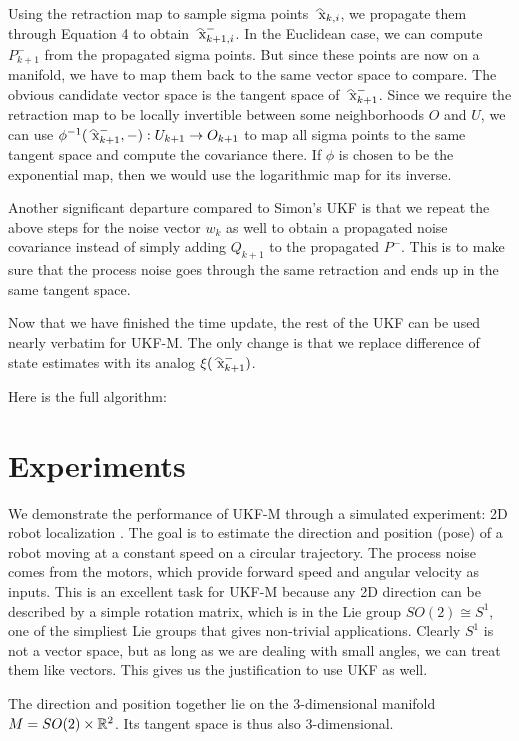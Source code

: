 \documentclass[12pt]{article}
\begin{document}
Using the retraction map to sample sigma points $ \wh{ x}_{k,i}$, we propagate them through Equation 4 to obtain $ \wh{ x}_{k+1,i}^{-}$. In the Euclidean case, we can compute $ P_{k+1}^{-}$ from the propagated sigma points. But since these points are now on a manifold, we have to map them back to the same vector space to compare. The obvious candidate vector space is the tangent space of $ \wh{ x}_{k+1}^{-}$. Since we require the retraction map to be locally invertible between some neighborhoods $O$ and $ U$, we can use $ \phi^{-1}(\wh{ x}_{k+1}^{-}, -) : U_{k+1} \to O_{k+1}$ to map all sigma points to the same tangent space and compute the covariance there. If $ \phi$ is chosen to be the exponential map, then we would use the logarithmic map for its inverse.

Another significant departure compared to Simon's UKF is that we repeat the above steps for the noise vector $ w_k$ as well to obtain a propagated noise covariance instead of simply adding $ Q_{k+1}$ to the propagated $ P^{-}$. This is to make sure that the process noise goes through the same retraction and ends up in the same tangent space.

Now that we have finished the time update, the rest of the UKF can be used nearly verbatim for UKF-M. The only change is that we replace difference of state estimates with its analog $ \xi(\wh{ x}_{k+1}^{-})$.

Here is the full algorithm:


\section{Experiments}

We demonstrate the performance of UKF-M through a simulated experiment: 2D robot localization \cite{}. The goal is to estimate the direction and position (pose) of a robot moving at a constant speed on a circular trajectory. The process noise comes from the motors, which provide forward speed and angular velocity as inputs. This is an excellent task for UKF-M because any 2D direction can be described by a simple rotation matrix, which is in the Lie group $ SO(2) \cong S^{1}$, one of the simpliest Lie groups that gives non-trivial applications. Clearly $ S^{1}$ is not a vector space, but as long as we are dealing with small angles, we can treat them like vectors. This gives us the justification to use UKF as well.

The direction and position together lie on the 3-dimensional manifold $M= SO(2) \times \mathbb{R}^2$. Its tangent space is thus also 3-dimensional.
\end{document}
